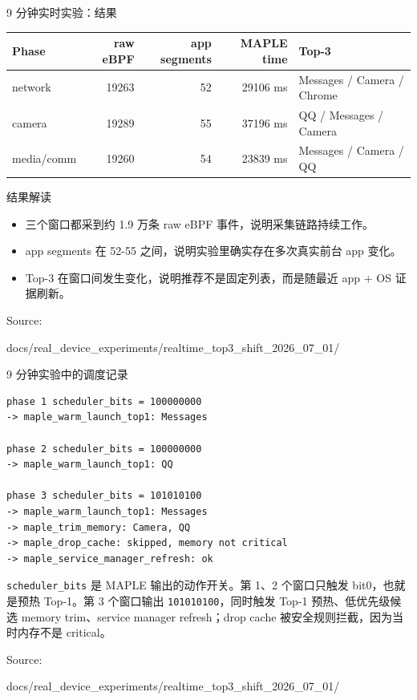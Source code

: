 \documentclass[UTF8,aspectratio=169,10pt]{ctexbeamer}
\newcommand{\code}[1]{\texttt{\small #1}}
\newcommand{\sourcefoot}[1]{%
  \vfill
  {\scriptsize\textcolor{memoGray}{Source: }%
  \parbox[t]{0.84\textwidth}{\raggedright\ttfamily\scriptsize #1}}%
}
\newcommand{\explainfoot}[1]{%
  \vspace{0.35em}
  {\scriptsize\color{memoGray}#1}
}
\begin{document}
\begin{frame}{9 分钟实时实验：结果}
  \scriptsize
  \begin{tabular}{lrrrl}
    \toprule
    Phase & raw eBPF & app segments & MAPLE time & Top-3 \\
    \midrule
    network & 19263 & 52 & 29106 ms & Messages / Camera / Chrome \\
    camera & 19289 & 55 & 37196 ms & QQ / Messages / Camera \\
    media/comm & 19260 & 54 & 23839 ms & Messages / Camera / QQ \\
    \bottomrule
  \end{tabular}
  \vspace{0.55em}
  \begin{block}{结果解读}
    \begin{itemize}
      \item 三个窗口都采到约 1.9 万条 raw eBPF 事件，说明采集链路持续工作。
      \item app segments 在 52-55 之间，说明实验里确实存在多次真实前台 app 变化。
      \item Top-3 在窗口间发生变化，说明推荐不是固定列表，而是随最近 app + OS 证据刷新。
    \end{itemize}
  \end{block}
  \sourcefoot{docs/real\_device\_experiments/realtime\_top3\_shift\_2026\_07\_01/}
\end{frame}

\begin{frame}[fragile]{9 分钟实验中的调度记录}
\begin{lstlisting}
phase 1 scheduler_bits = 100000000
-> maple_warm_launch_top1: Messages

phase 2 scheduler_bits = 100000000
-> maple_warm_launch_top1: QQ

phase 3 scheduler_bits = 101010100
-> maple_warm_launch_top1: Messages
-> maple_trim_memory: Camera, QQ
-> maple_drop_cache: skipped, memory not critical
-> maple_service_manager_refresh: ok
\end{lstlisting}
  \explainfoot{\code{scheduler\_bits} 是 MAPLE 输出的动作开关。第 1、2 个窗口只触发 bit0，也就是预热 Top-1。第 3 个窗口输出 \code{101010100}，同时触发 Top-1 预热、低优先级候选 memory trim、service manager refresh；drop cache 被安全规则拦截，因为当时内存不是 critical。}
  \sourcefoot{docs/real\_device\_experiments/realtime\_top3\_shift\_2026\_07\_01/}
\end{frame}
\end{document}
